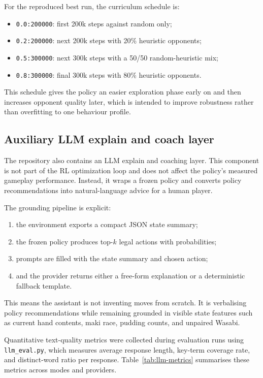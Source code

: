 \documentclass[10pt]{article}
\begin{document}
For the reproduced best run, the curriculum schedule is:
\begin{itemize}
  \item \texttt{0.0:200000}: first 200k steps against random only;
  \item \texttt{0.2:200000}: next 200k steps with 20\% heuristic opponents;
  \item \texttt{0.5:300000}: next 300k steps with a 50/50 random-heuristic mix;
  \item \texttt{0.8:300000}: final 300k steps with 80\% heuristic opponents.
\end{itemize}

This schedule gives the policy an easier exploration phase early on and then increases opponent quality later, which is intended to improve robustness rather than overfitting to one behaviour profile.

\subsection{Auxiliary LLM explain and coach layer}

The repository also contains an LLM explain and coaching layer. This component is not part of the RL optimization loop and does not affect the policy's measured gameplay performance. Instead, it wraps a frozen policy and converts policy recommendations into natural-language advice for a human player.

The grounding pipeline is explicit:
\begin{enumerate}
  \item the environment exports a compact JSON state summary;
  \item the frozen policy produces top-\(k\) legal actions with probabilities;
  \item prompts are filled with the state summary and chosen action;
  \item and the provider returns either a free-form explanation or a deterministic fallback template.
\end{enumerate}

This means the assistant is not inventing moves from scratch. It is verbalising policy recommendations while remaining grounded in visible state features such as current hand contents, maki race, pudding counts, and unpaired Wasabi.

Quantitative text-quality metrics were collected during evaluation runs using \texttt{llm\_eval.py}, which measures average response length, key-term coverage rate, and distinct-word ratio per response. Table~\ref{tab:llm-metrics} summarises these metrics across modes and providers.
\end{document}
